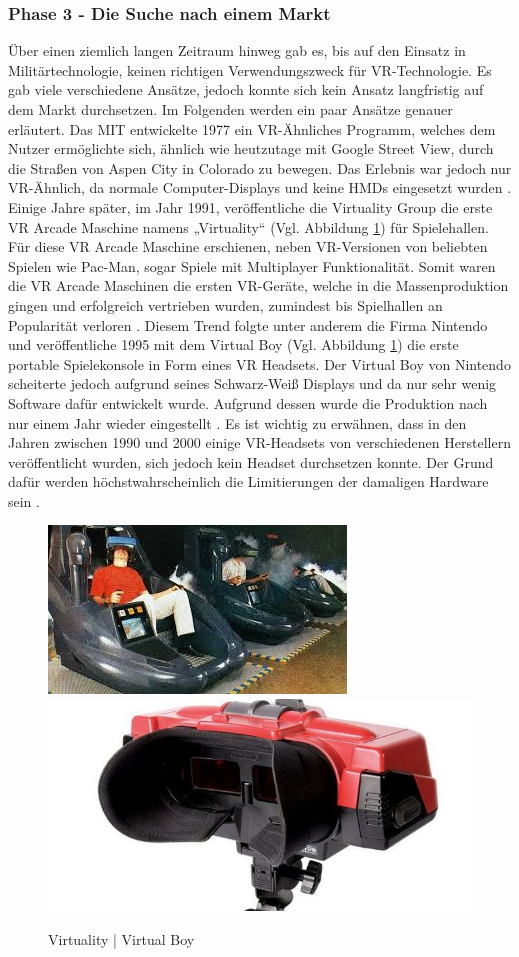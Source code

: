 \subsubsection{Phase 3 - Die Suche nach einem Markt}
Über einen ziemlich langen Zeitraum hinweg gab es, bis auf den Einsatz in Militärtechnologie, keinen richtigen Verwendungszweck für VR-Technologie. Es gab viele verschiedene Ansätze, jedoch konnte sich kein Ansatz langfristig auf dem Markt durchsetzen. Im Folgenden werden ein paar Ansätze genauer erläutert.
\newline\newline
Das MIT entwickelte 1977 ein VR-Ähnliches Programm, welches dem Nutzer ermöglichte sich, ähnlich wie heutzutage mit Google Street View, durch die Straßen von Aspen City in Colorado zu bewegen. Das Erlebnis war jedoch nur VR-Ähnlich, da normale Computer-Displays und keine HMDs eingesetzt wurden \cite{20}.
Einige Jahre später, im Jahr 1991, veröffentliche die Virtuality Group die erste VR Arcade Maschine namens „Virtuality“ (Vgl. Abbildung \ref{fig:VirtualityVRBoy}) für Spielehallen. Für diese VR Arcade Maschine erschienen, neben VR-Versionen von beliebten Spielen wie Pac-Man, sogar Spiele mit Multiplayer Funktionalität. Somit waren die VR Arcade Maschinen die ersten VR-Geräte, welche in die Massenproduktion gingen und erfolgreich vertrieben wurden, zumindest bis Spielhallen an Popularität verloren \cite{20}.
\newline
Diesem Trend folgte unter anderem die Firma Nintendo und veröffentliche 1995 mit dem Virtual Boy (Vgl. Abbildung \ref{fig:VirtualityVRBoy}) die erste portable Spielekonsole in Form eines VR Headsets. Der Virtual Boy von Nintendo scheiterte jedoch aufgrund seines Schwarz-Weiß Displays und da nur sehr wenig Software dafür entwickelt wurde. Aufgrund dessen wurde die Produktion nach nur einem Jahr wieder eingestellt \cite{20}. Es ist wichtig zu erwähnen, dass in den Jahren zwischen 1990 und 2000 einige VR-Headsets von verschiedenen Herstellern veröffentlicht wurden, sich jedoch kein Headset durchsetzen konnte. Der Grund dafür werden höchstwahrscheinlich die Limitierungen der damaligen Hardware sein \cite{10}.
\begin{figure}[h]
	\centering
	\includegraphics[width=0.4\linewidth]{Bilder/A17_Virtuality}
	\includegraphics[width=0.4\linewidth]{Bilder/A18_VIrtualBoy}
	\caption{Virtuality | Virtual Boy \cite{20, A18}}
	\label{fig:VirtualityVRBoy}
\end{figure}

